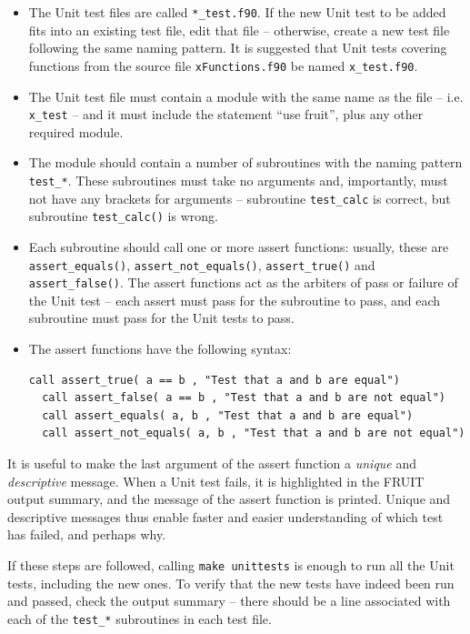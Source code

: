 \begin{itemize}
\item The Unit test files are called \texttt{*\_test.f90}. If the new
  Unit test to be added fits into an existing test file, edit that
  file -- otherwise, create a new test file following the same naming
  pattern. It is suggested that Unit tests covering functions from the
  source file \texttt{xFunctions.f90} be named \texttt{x\_test.f90}.
\item The Unit test file must contain a module with the same name as
  the file -- i.e. \texttt{x\_test} -- and it must include the
  statement ``use fruit'', plus any other required module.
\item The module should contain a number of subroutines with the
  naming pattern \texttt{test\_*}. These subroutines must take no
  arguments and, importantly, must not have any brackets for arguments
  -- subroutine \texttt{test\_calc} is correct, but subroutine
  \texttt{test\_calc()} is wrong.
\item Each subroutine should call one or more assert functions:
  usually, these are \texttt{assert\_equals()}, \texttt{assert\_not\_equals()},
  \texttt{assert\_true()} and \texttt{assert\_false()}. The assert functions
  act as the arbiters of pass or failure of the Unit test -- each
  assert must pass for the subroutine to pass, and each subroutine
  must pass for the Unit tests to pass.
\item The assert functions have the following syntax:
  \begin{Verbatim}[fontsize=\small]
  call assert_true( a == b , "Test that a and b are equal")
  call assert_false( a == b , "Test that a and b are not equal")
  call assert_equals( a, b , "Test that a and b are equal")
  call assert_not_equals( a, b , "Test that a and b are not equal")
  \end{Verbatim}
\end{itemize}

It is useful to make the last argument of the assert function a
\emph{unique} and \emph{descriptive} message. When a Unit test fails,
it is highlighted in the FRUIT output summary, and the message of the
assert function is printed. Unique and descriptive messages thus
enable faster and easier understanding of which test has failed,
and perhaps why.

If these steps are followed, calling \texttt{make\ unittests} is
enough to run all the Unit tests, including the new ones. To verify
that the new tests have indeed been run and passed, check the output
summary -- there should be a line associated with each of the
\texttt{test\_*} subroutines in each test file.

